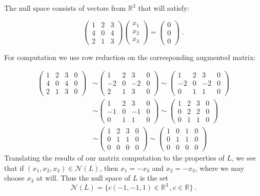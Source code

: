 \documentclass[11pt]{article}
\begin{document}
The null space consists of vectors from $\mathbb{R}^3$ that will satisfy:

$$\begin{pmatrix}
1&2&3 \\ 4&0&4 \\ 2&1&3
\end{pmatrix} \begin{pmatrix}
x_1 \\ x_2 \\ x_3
\end{pmatrix} = \begin{pmatrix}
0 \\ 0 \\ 0
\end{pmatrix} \;.$$

For computation we use row reduction on the corresponding augmented matrix:

\begin{align*}
\begin{pmatrix} 1&2&3 & 0 \\ 4&0&4 &0\\ 2&1&3&0 \end{pmatrix} &\sim
\begin{pmatrix}
1&2&3 & 0 \\ -2&0&-2 &0\\ 2&1&3&0
\end{pmatrix}
\sim \begin{pmatrix}
1&2&3 & 0 \\ -2&0&-2 &0\\ 0&1&1&0
\end{pmatrix} \\
&\sim \begin{pmatrix}
1&2&3 & 0 \\ -1&0&-1 &0\\ 0&1&1&0
\end{pmatrix} \sim \begin{pmatrix}
1&2&3 & 0 \\ 0&2&2 &0\\ 0&1&1&0
\end{pmatrix} \\ &\sim \begin{pmatrix}
1&2&3 & 0 \\ 0&1&1 &0\\ 0&0&0&0
\end{pmatrix} \sim \begin{pmatrix}
1&0&1 & 0 \\ 0&1&1 &0\\ 0&0&0&0
\end{pmatrix}
\end{align*}
Translating the results of our matrix computation to the properties of $L$, we see that if $(x_1,x_2,x_3) \in \mathcal{N}(L)$, then $x_1 = -x_3$ and $x_2 = -x_3$, where we may choose $x_3$ at will. Thus the null space of $L$ is the set$$\mathcal{N}(L) = \{c(-1,-1,1) \in \mathbb{R}^3 \, , c \in \mathbb{R}\} \,.$$
\end{document}
